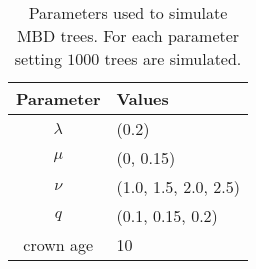 \begin{table}[ht]
  \centering
  \begin{tabular}{ | c | l | }
    \hline
    \textbf{Parameter} &
    \textbf{Values} \\ 
    \hline
    $\lambda$ & (0.2) \\
    $\mu$ & (0, 0.15) \\
    $\nu$ & (1.0, 1.5, 2.0, 2.5) \\
    $q$ & (0.1, 0.15, 0.2) \\
    crown age & 10 \\
    \hline
  \end{tabular}
  \caption{
    Parameters used to simulate MBD trees. For each parameter setting $1000$ trees are simulated.
  }
  \label{tab:simulation_parameters}
\end{table}